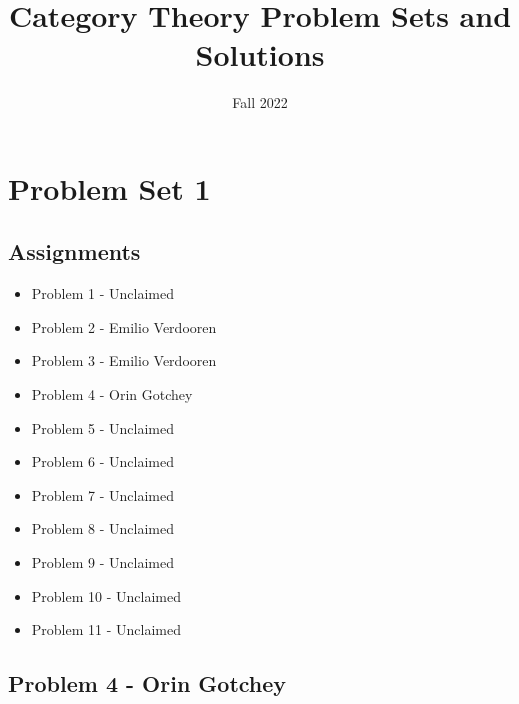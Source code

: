 \documentclass{article}
\title{Category Theory Problem Sets and Solutions}
\author{Fall 2022}
\begin{document}
\maketitle
\tableofcontents
\newpage
\section{Problem Set 1}
\subsection{Assignments}
\begin{itemize}
    \item Problem 1 - Unclaimed
    \item Problem 2 - Emilio Verdooren
    \item Problem 3 - Emilio Verdooren
    \item Problem 4 - Orin Gotchey
    \item Problem 5 - Unclaimed
    \item Problem 6 - Unclaimed
    \item Problem 7 - Unclaimed
    \item Problem 8 - Unclaimed
    \item Problem 9 - Unclaimed
    \item Problem 10 - Unclaimed
    \item Problem 11 - Unclaimed
\end{itemize}

\subsection{Problem 4 - Orin Gotchey}
\end{document}

